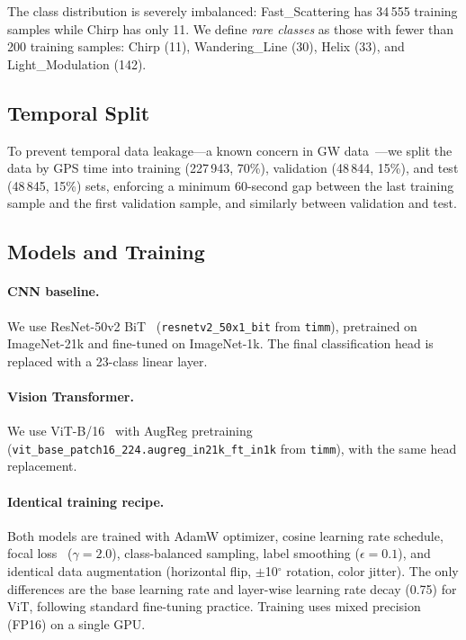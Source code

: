 \documentclass[12pt]{article}
\newcommand{\Ntrain}{227\,943}
\newcommand{\Nval}{48\,844}
\newcommand{\Ntest}{48\,845}
\newcommand{\Nclasses}{23}
\newcommand{\NrareThreshold}{200}
\begin{document}
The class distribution is severely imbalanced: Fast\_Scattering has 34\,555
training samples while Chirp has only 11.
We define \emph{rare classes} as those with fewer than \NrareThreshold{}
training samples: Chirp (11), Wandering\_Line (30), Helix (33), and
Light\_Modulation (142).

\subsection{Temporal Split}
\label{sec:split}

To prevent temporal data leakage---a known concern in GW
data~\citep{Zevin2024}---we split the data by GPS time into training
(\Ntrain, 70\%), validation (\Nval, 15\%), and test (\Ntest, 15\%) sets,
enforcing a minimum 60-second gap between the last training sample and
the first validation sample, and similarly between validation and test.

\subsection{Models and Training}
\label{sec:models}

\paragraph{CNN baseline.}
We use ResNet-50v2 BiT~\citep{BiT2020} (\texttt{resnetv2\_50x1\_bit}
from \texttt{timm}), pretrained on ImageNet-21k and fine-tuned on
ImageNet-1k.
The final classification head is replaced with a \Nclasses-class linear layer.

\paragraph{Vision Transformer.}
We use ViT-B/16~\citep{Dosovitskiy2021} with AugReg
pretraining~\citep{AugReg2022}
(\texttt{vit\_base\_patch16\_224.augreg\_in21k\_ft\_in1k} from \texttt{timm}),
with the same head replacement.

\paragraph{Identical training recipe.}
Both models are trained with AdamW optimizer, cosine learning rate schedule,
focal loss~\citep{Lin2017} ($\gamma = 2.0$), class-balanced sampling, label
smoothing ($\epsilon = 0.1$), and identical data augmentation (horizontal flip,
$\pm$10$^\circ$ rotation, color jitter).
The only differences are the base learning rate and layer-wise learning rate
decay (0.75) for ViT, following standard fine-tuning practice.
Training uses mixed precision (FP16) on a single GPU.
\end{document}
